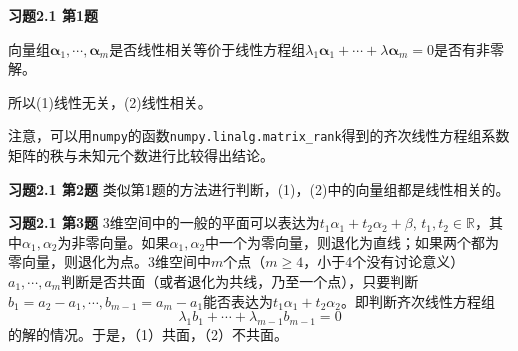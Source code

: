 
\renewcommand{\newpageorvspace}{\vspace{2em}}

\date{第二次作业}



\maketitle

{\bf 习题2.1 第1题}

向量组$\mathbf{\alpha}_1, \cdots, \mathbf{\alpha}_m$是否线性相关等价于线性方程组$\lambda_1\mathbf{\alpha}_1 + \cdots + \lambda\mathbf{\alpha}_m = 0$是否有非零解。

所以(1)线性无关，(2)线性相关。

注意，可以用\texttt{numpy}的函数\texttt{numpy.linalg.matrix\_rank}得到的齐次线性方程组系数矩阵的秩与未知元个数进行比较得出结论。

\newpageorvspace

{\bf 习题2.1 第2题} 类似第1题的方法进行判断，(1)，(2)中的向量组都是线性相关的。

\newpageorvspace

{\bf 习题2.1 第3题} 3维空间中的一般的平面可以表达为$t_1\alpha_1 + t_2\alpha_2 + \beta$, $t_1,t_2\in\mathbb{R}$，其中$\alpha_1,\alpha_2$为非零向量。如果$\alpha_1,\alpha_2$中一个为零向量，则退化为直线；如果两个都为零向量，则退化为点。3维空间中$m$个点（$m\geqslant 4$，小于4个没有讨论意义）$a_1,\cdots,a_m$判断是否共面（或者退化为共线，乃至一个点），只要判断$b_1 = a_2-a_1, \cdots, b_{m-1}=a_m-a_1$能否表达为$t_1\alpha_1 + t_2\alpha_2$。即判断齐次线性方程组
$$\lambda_1 b_1 + \cdots + \lambda_{m-1} b_{m-1} = 0$$
的解的情况。于是，（1）共面，（2）不共面。

\newpageorvspace

